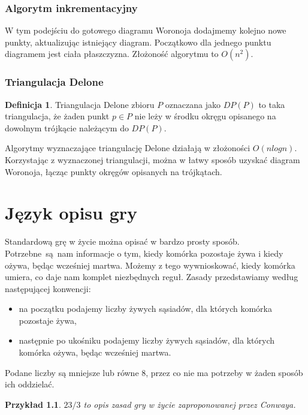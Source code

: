 \documentclass[declaration,shortabstract, inz]{iithesis}
\theoremstyle{definition} \newtheorem{definition}{Definicja}[]
\theoremstyle{plain} \newtheorem{remark}[definition]{Obserwacja}
\theoremstyle{plain} \newtheorem{theorem}[definition]{Twierdzenie}
\theoremstyle{plain} \newtheorem{example}{Przykład}[definition]
\theoremstyle{plain} \newtheorem{lemma}[definition]{Lemat}
\begin{document}
\subsection{Algorytm inkrementacyjny}

W tym podejściu do gotowego diagramu Woronoja dodajmemy kolejno nowe punkty, aktualizując istniejący diagram. Początkowo dla jednego punktu diagramem jest ciała płaszczyzna. Złożoność algorytmu to $O(n^2)$.

\subsection{Triangulacja Delone}

\begin{definition}
Triangulacja Delone zbioru $P$ oznaczana jako $DP(P)$ to taka triangulacja, że żaden punkt $p \in P$ nie leży w środku okręgu opisanego na dowolnym trójkącie należącym do $DP(P)$. 
\end{definition}

Algorytmy wyznaczające triangulację Delone działają w złożoności $O(nlogn)$.
Korzystając z wyznaczonej triangulacji, można w łatwy sposób uzyskać diagram Woronoja, łącząc punkty okręgów opisanych na trójkątach. 

\chapter{Język opisu gry}
\label{sec:parser}
Standardową grę w życie można opisać w bardzo prosty sposób. Potrzebne~są~nam informacje o tym, kiedy komórka pozostaje żywa i kiedy ożywa, będąc wcześniej martwa. Możemy z tego wywnioskować, kiedy komórka umiera, co daje nam komplet niezbędnych reguł. Zasady przedstawiamy według następującej konwencji:
\begin{itemize}
\item na początku podajemy liczby żywych sąsiadów, dla których komórka pozostaje żywa,
\item następnie po ukośniku podajemy liczby żywych sąsiadów, dla których komórka ożywa, będąc wcześniej martwa.
\end{itemize}

Podane liczby są mniejsze lub równe $8$, przez co nie ma potrzeby w żaden sposób ich oddzielać.

\begin{example}
$23/3$ to opis zasad gry w życie zaproponowanej przez Conwaya.
\end{example}
\end{document}
